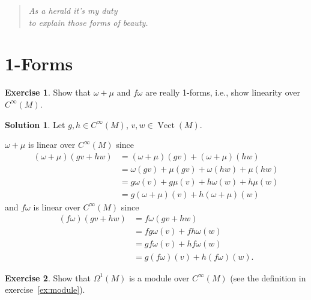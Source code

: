 \documentclass[11pt, a4paper]{report}
\theoremstyle{definition}
\newtheorem{exercise}{Exercise}[part]
\newtheorem{solution}{Solution}[part]
\newenvironment{ex}{\begin{exercise}}{\end{exercise}\pagebreak[1]}
\newenvironment{sol}{\begin{solution}}{\end{solution}\pagebreak[3]}
\newenvironment{epigraph}
    {\begin{quote}\small\itshape} %
    {\end{quote}\ignorespacesafterend\vspace{\parskip}}
\DeclareMathOperator{\Vect}{Vect}
\begin{document}
\begin{epigraph}
    As a herald it's my duty \\
    \mbox{}\hspace{1em} to explain those forms of beauty.
\end{epigraph}

\section{1-Forms}

\begin{ex}

Show that $\omega + \mu$ and $f\omega$ are really 1-forms, i.e., show linearity over $C^\infty(M)$.

\end{ex}

\begin{sol}

Let $g, h \in C^\infty(M)$, $v, w \in \Vect(M)$.

$\omega + \mu$ is linear over $C^\infty(M)$ since
\begin{align*}
    (\omega + \mu)(gv + hw) &= (\omega + \mu)(gv) + (\omega + \mu)(hw) \\
        &= \omega(gv) + \mu(gv) + \omega(hw) + \mu(hw) \\
        &= g\omega(v) + g\mu(v) + h\omega(w) + h\mu(w) \\
        &= g(\omega + \mu)(v)  + h(\omega + \mu)(w)
\end{align*}
and $f\omega$ is linear over $C^\infty(M)$ since
\begin{align*}
    (f\omega)(gv + hw) &= f\omega(gv + hw) \\
                       &= fg\omega(v) + fh\omega(w) \\
                       &= gf\omega(v) + hf\omega(w) \\
                       &= g(f\omega)(v) + h(f\omega)(w).
\end{align*}

\end{sol}

\begin{ex}

Show that $\Omega^1(M)$ is a module over $C^\infty(M)$ (see the definition in exercise~\ref{ex:module}).

\end{ex}
\end{document}
